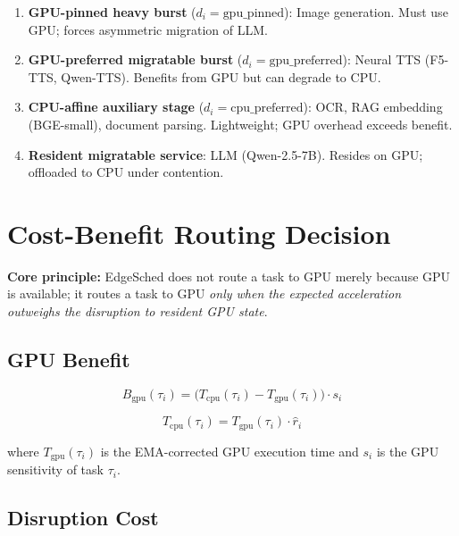 \documentclass{article}
\begin{document}
\begin{enumerate}
    \item \textbf{GPU-pinned heavy burst} ($d_i = \text{gpu\_pinned}$):
          Image generation. Must use GPU; forces asymmetric migration of LLM.

    \item \textbf{GPU-preferred migratable burst} ($d_i = \text{gpu\_preferred}$):
          Neural TTS (F5-TTS, Qwen-TTS). Benefits from GPU but can degrade to CPU.

    \item \textbf{CPU-affine auxiliary stage} ($d_i = \text{cpu\_preferred}$):
          OCR, RAG embedding (BGE-small), document parsing. Lightweight;
          GPU overhead exceeds benefit.

    \item \textbf{Resident migratable service}:
          LLM (Qwen-2.5-7B). Resides on GPU; offloaded to CPU under contention.
\end{enumerate}

\section*{Cost-Benefit Routing Decision}

\noindent\textbf{Core principle:} EdgeSched does not route a task to GPU merely
because GPU is available; it routes a task to GPU \emph{only when the expected
acceleration outweighs the disruption to resident GPU state}.

\subsection*{GPU Benefit}

\begin{equation}
B_{\text{gpu}}(\tau_i) = \bigl(T_{\text{cpu}}(\tau_i) - T_{\text{gpu}}(\tau_i)\bigr) \cdot s_i
\end{equation}

\begin{equation}
T_{\text{cpu}}(\tau_i) = T_{\text{gpu}}(\tau_i) \cdot \hat{r}_i
\end{equation}

where $T_{\text{gpu}}(\tau_i)$ is the EMA-corrected GPU execution time and
$s_i$ is the GPU sensitivity of task $\tau_i$.

\subsection*{Disruption Cost}
\end{document}

